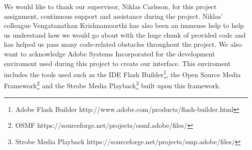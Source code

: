 We would like to thank our supervisor, Niklas Carlsson, for this project assignment, continuous support and assistance during the project. Niklas’ colleague Vengatanathan Krishnamoorthi has also been an immense help to help us understand how we would go about with the huge chunk of provided code and has helped us pass many code-related obstacles throughout the project. 
We also want to acknowledge Adobe Systems Incorporated for the development enviroment used during this project to create our interface. This enviroment includes the tools used such as the IDE Flash Builder\footnote{Adobe Flash Builder http://www.adobe.com/products/flash-builder.html}, the Open Source Media Framework\footnote{OSMF https://sourceforge.net/projects/osmf.adobe/files/} and the Strobe Media Playback\footnote{Strobe Media Playback https://sourceforge.net/projects/smp.adobe/files/} built upon this framework.
